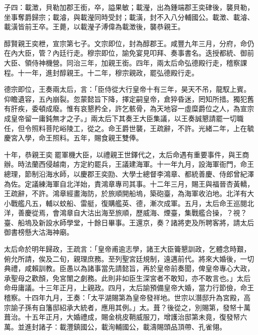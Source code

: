 \begin{pinyinscope}
子四：載澂，貝勒加郡王銜，卒，謚果敏；載瀅，出為鍾端郡王奕硉後，襲貝勒，坐事奪爵歸宗；載濬，與載瀅同時受封；載潢，封不入八分輔國公。載澂、載濬、載潢皆前王卒。王薨，以載瀅子溥偉為載澂後，襲恭親王。

醇賢親王奕枻，宣宗第七子。文宗即位，封為醇郡王。咸豐九年三月，分府，命仍在內大臣，管？內廷行走。穆宗即位，諭免宴見叩拜、奏事書名。迭授都統、御前大臣、領侍神機營。同治三年，加親王銜。四年，兩太后命弘德殿行走，稽察課程。十一年，進封醇親王。十二年，穆宗親政，罷弘德殿行走。

德宗即位，王奏兩太后，言：「臣侍從大行皇帝十有三年，昊天不吊，龍馭上賓。仰瞻遺容，五內崩裂。忽蒙懿旨下降，擇定嗣皇帝，倉猝昏迷，罔知所措。獨犯舊有肝疾，委頓成廢。惟有哀懇矜全，許乞骸骨，為天地容一虛糜爵位之人，為宣宗成皇帝留一庸鈍無才之子。」兩太后下其奏王大臣集議，以王奏誠懇請罷一切職任，但令照料菩陀峪陵工，從之。命王爵世襲，王疏辭，不許。光緒二年，上在毓慶宮入學，命王照料。五年，賜食親王雙俸。

十年，恭親王奕罷軍機大臣，以禮親王世鐸代之，太后命遇有重要事件，與王商辦。時法蘭西侵越南，方定約罷兵，王議建海軍。十一年九月，設海軍衙門，命王總理，節制沿海水師，以慶郡王奕劻、大學士總督李鴻章、都統善慶、侍郎曾紀澤為佐。定議練海軍自北洋始，責鴻章專司其事。十二年三月，賜王與福晉杏黃轎，王疏辭，不許。鴻章經畫海防，於旅順開船塢，築砲臺，為海軍收泊地。北洋有大小戰艦凡五，輔以蚊船、雷艇，復購艦英、德，漸次成軍。五月，太后命王巡閱北洋，善慶從焉，會鴻章自大沽出海至旅順，歷威海、煙臺，集戰艦合操，？視？臺、船塢及新設水師學堂，十餘日畢事。王還京，奏？諸將吏及所聘客將，請太后御書榜懸大沽海神廟。

太后命於明年歸政，王疏言：「皇帝甫逾志學，諸王大臣籥懇訓政，乞體念時艱，俯允所請，俟及二旬，親理庶務。至列聖宮廷規制，遠邁前代。將來大婚後，一切典禮，咸賴訓教。臣愚以為諸事當先請懿旨，再於皇帝前奏聞，俾皇帝專心大政，承聖母之歡顏，免宮闈之劇務。此則非如臣生深宮者不敢知，亦不敢言也。」太后命毋庸議。十三年正月，上親政。四月，太后諭預備皇帝大婚，當力行節儉，命王稽察。十四年九月，王奏：「太平湖賜第為皇帝發祥地。世宗以潛邸升為宮殿，高宗諭子孫有自籓邸紹承大統者，應用其例。」太。葺？後從之，別賜第，發帑十萬葺治。十五年正月，大婚禮成，賜金桃皮鞘威服刀，增護治邸第未竟，復發帑六萬。並進封諸子：載灃鎮國公，載洵輔國公，載濤賜頭品頂帶、孔雀翎。


\end{pinyinscope}

